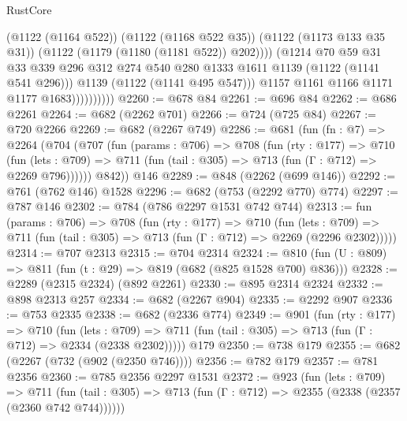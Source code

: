 \begin{lexlean}{RustCore}
\begin{coremodule}
                              (@1122 (@1164 @522))
                              (@1122 (@1168 @522 @35))
                              (@1122 (@1173 @133 @35 @31))
                              (@1122 (@1179 (@1180 (@1181 @522)) @202))))
                          (@1214
                            @70
                            @59
                            @31
                            @33
                            @339
                            @296
                            @312
                            @274
                            @540
                            @280
                            @1333
                            @1611
                            @1139
                            (@1122 (@1141 @541 @296)))
                          @1139
                          (@1122 (@1141 @495 @547)))
                        @1157
                        @1161
                        @1166
                        @1171
                        @1177
                        @1683))))))))))
@2260 := @678 @84
@2261 := @696 @84
@2262 := @686 @2261
@2264 := @682 (@2262 @701)
@2266 := @724 (@725 @84)
@2267 := @720 @2266
@2269 := @682 (@2267 @749)
@2286 := @681
    (fun (fn : @7) =>
    @2264
      (@704
        (@707
          (fun (params : @706) =>
          @708
            (fun (rty : @177) =>
            @710
              (fun (lets : @709) =>
              @711 (fun (tail : @305) => @713 (fun (Γ : @712) => @2269 @796))))))
        @842))
    @146
@2289 := @848 (@2262 (@699 @146))
@2292 := @761 (@762 @146) @1528
@2296 := @682 (@753 (@2292 @770) @774)
@2297 := @787 @146
@2302 := @784 (@786 @2297 @1531 @742 @744)
@2313 := fun (params : @706) =>
  @708
    (fun (rty : @177) =>
    @710
      (fun (lets : @709) =>
      @711 (fun (tail : @305) => @713 (fun (Γ : @712) => @2269 (@2296 @2302)))))
@2314 := @707 @2313
@2315 := @704 @2314
@2324 := @810 (fun (U : @809) => @811 (fun (t : @29) => @819 (@682 (@825 @1528 @700) @836)))
@2328 := @2289 (@2315 @2324) (@892 @2261)
@2330 := @895 @2314 @2324
@2332 := @898 @2313 @257
@2334 := @682 (@2267 @904)
@2335 := @2292 @907
@2336 := @753 @2335
@2338 := @682 (@2336 @774)
@2349 := @901
    (fun (rty : @177) =>
    @710
      (fun (lets : @709) =>
      @711 (fun (tail : @305) => @713 (fun (Γ : @712) => @2334 (@2338 @2302)))))
    @179
@2350 := @738 @179
@2355 := @682 (@2267 (@732 (@902 (@2350 @746))))
@2356 := @782 @179
@2357 := @781 @2356
@2360 := @785 @2356 @2297 @1531
@2372 := @923
    (fun (lets : @709) =>
    @711 (fun (tail : @305) => @713 (fun (Γ : @712) => @2355 (@2338 (@2357 (@2360 @742 @744))))))

\end{coremodule}
\end{lexlean}
